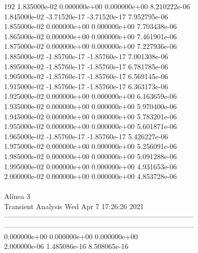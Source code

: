 192	1.835000e-02	0.000000e+00	0.000000e+00	8.210222e-06	\\ 	1.845000e-02	-3.71520e-17	-3.71520e-17	7.952795e-06	\\ 	1.855000e-02	0.000000e+00	0.000000e+00	7.703438e-06	\\ 	1.865000e-02	0.000000e+00	0.000000e+00	7.461901e-06	\\ 	1.875000e-02	0.000000e+00	0.000000e+00	7.227936e-06	\\ 	1.885000e-02	-1.85760e-17	-1.85760e-17	7.001308e-06	\\ 	1.895000e-02	-1.85760e-17	-1.85760e-17	6.781785e-06	\\ 	1.905000e-02	-1.85760e-17	-1.85760e-17	6.569145e-06	\\ 	1.915000e-02	-1.85760e-17	-1.85760e-17	6.363173e-06	\\ 	1.925000e-02	0.000000e+00	0.000000e+00	6.163659e-06	\\ 	1.935000e-02	0.000000e+00	0.000000e+00	5.970400e-06	\\ 	1.945000e-02	0.000000e+00	0.000000e+00	5.783201e-06	\\ 	1.955000e-02	0.000000e+00	0.000000e+00	5.601871e-06	\\ 	1.965000e-02	-1.85760e-17	-1.85760e-17	5.426227e-06	\\ 	1.975000e-02	0.000000e+00	0.000000e+00	5.256091e-06	\\ 	1.985000e-02	0.000000e+00	0.000000e+00	5.091288e-06	\\ 	1.995000e-02	0.000000e+00	0.000000e+00	4.931653e-06	\\ 	2.000000e-02	0.000000e+00	0.000000e+00	4.853728e-06	\\ \hline
\\ \hline
                                   Alínea 3 \\ \hline
                                   Transient Analysis  Wed Apr  7 17:26:26  2021\\ \hline
--------------------------------------------------------------------------------\\ \hline
--------------------------------------------------------------------------------\\ 	0.000000e+00	0.000000e+00	0.000000e+00	\\ 	2.000000e-06	1.485086e-16	8.508065e-16	\\ \hline
